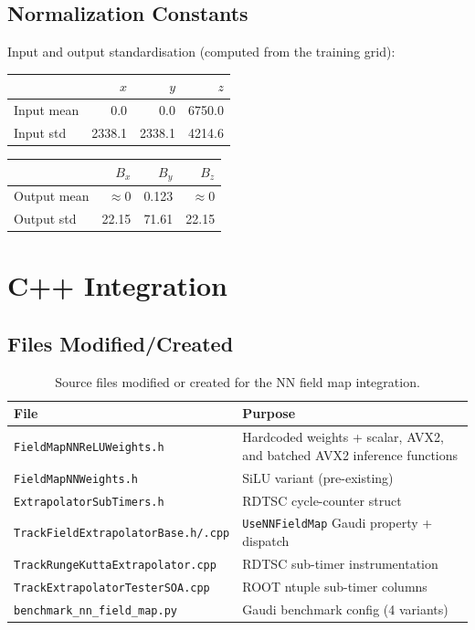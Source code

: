 \documentclass[11pt,a4paper]{article}
\begin{document}
\subsection{Normalization Constants}

Input and output standardisation (computed from the training grid):

\begin{center}
\begin{tabular}{lrrr}
\toprule
 & $x$ & $y$ & $z$ \\
\midrule
Input mean  & 0.0 & 0.0 & 6750.0 \\
Input std   & 2338.1 & 2338.1 & 4214.6 \\
\bottomrule
\end{tabular}
\qquad
\begin{tabular}{lrrr}
\toprule
 & $B_x$ & $B_y$ & $B_z$ \\
\midrule
Output mean & $\approx 0$ & 0.123 & $\approx 0$ \\
Output std  & 22.15 & 71.61 & 22.15 \\
\bottomrule
\end{tabular}
\end{center}

\section{C++ Integration}
\label{sec:cpp}

\subsection{Files Modified/Created}

\begin{table}[H]
\centering
\caption{Source files modified or created for the NN field map integration.}
\label{tab:files}
\begin{tabular}{lp{8cm}}
\toprule
File & Purpose \\
\midrule
\texttt{FieldMapNNReLUWeights.h} & Hardcoded weights + scalar, AVX2, and
  batched AVX2 inference functions \\
\texttt{FieldMapNNWeights.h} & SiLU variant (pre-existing) \\
\texttt{ExtrapolatorSubTimers.h} & RDTSC cycle-counter struct \\
\texttt{TrackFieldExtrapolatorBase.h/.cpp} & \texttt{UseNNFieldMap} Gaudi
  property + dispatch \\
\texttt{TrackRungeKuttaExtrapolator.cpp} & RDTSC sub-timer instrumentation \\
\texttt{TrackExtrapolatorTesterSOA.cpp} & ROOT ntuple sub-timer columns \\
\texttt{benchmark\_nn\_field\_map.py} & Gaudi benchmark config (4 variants) \\
\bottomrule
\end{tabular}
\end{table}
\end{document}
